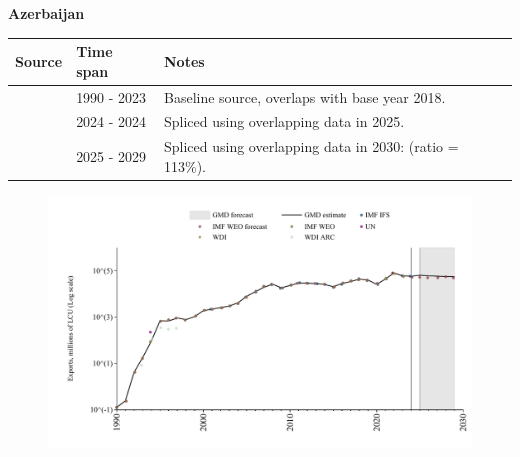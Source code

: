 \documentclass[12pt,a4paper,landscape]{article}
\begin{document}
\begin{adjustbox}{max totalsize={\paperwidth}{\paperheight},center}
\begin{minipage}[t][\textheight][t]{\textwidth}
\begin{figure}[H]
\end{figure}
\end{minipage}
\end{adjustbox}
\begin{adjustbox}{max totalsize={\paperwidth}{\paperheight},center}
\begin{minipage}[t][\textheight][t]{\textwidth}
\vspace*{0.5cm}
{}
\begin{center}
{\Large\bfseries Azerbaijan}
\end{center}
\vspace{0.5cm}
\begin{table}[H]
\centering
\small
\begin{tabular}{|l|l|l|}
\hline
\textbf{Source} & \textbf{Time span} & \textbf{Notes} \\
\hline
\rowcolor{white}\cite{WDI}& 1990 - 2023 &Baseline source, overlaps with base year 2018.\\
\rowcolor{lightgray}\cite{IMF_IFS}& 2024 - 2024 &Spliced using overlapping data in 2025.\\
\rowcolor{white}\cite{IMF_WEO_forecast}& 2025 - 2029 &Spliced using overlapping data in 2030: (ratio = 113\%).\\
\hline
\end{tabular}
\end{table}
\begin{figure}[H]
\centering
\includegraphics[width=\textwidth,height=0.6\textheight,keepaspectratio]{graphs/AZE_exports.pdf}
\end{figure}
\end{minipage}
\end{adjustbox}
\end{document}
